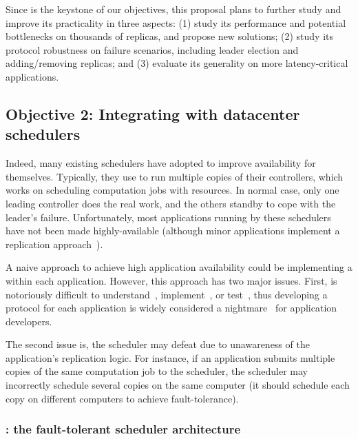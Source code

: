  Since \falcon is the keystone of our objectives, this 
proposal plans to further study and improve its practicality in three aspects: 
(1) study its performance and potential bottlenecks on thousands of replicas, 
and propose new solutions; (2) study its protocol robustness on failure 
scenarios, including leader election and adding/removing replicas; and (3) 
evaluate its generality on more latency-critical applications. 

\vspace{-.15in}\subsection{Objective 2: Integrating \falcon with datacenter 
schedulers}\label{sec:scheduler}\vspace{-.075in}

Indeed, many existing schedulers have adopted \paxos to improve availability 
for themselves. Typically, they use \paxos to run multiple copies of their 
controllers, which works on scheduling computation jobs with resources. In 
normal case, only one leading controller does the real work, and the others 
standby to cope with the leader's failure. Unfortunately, most applications 
running by these schedulers have not been made highly-available (although minor 
applications implement a replication 
approach~\cite{mapreduce,dolly:nsdi13}).

A naive approach to achieve high application availability could be implementing 
a \paxos within each application. However, this approach has two major issues. 
First, \paxos is notoriously difficult to 
understand~\cite{raft:usenix14,paxos:simple}, implement~\cite{paxos:practical, 
paxos:live}, or test~\cite{modist:nsdi09,demeter:sosp11}, thus developing a 
\paxos protocol for each application is widely considered a 
nightmare~\cite{modist:nsdi09,demeter:sosp11,paxos:live} for application 
developers.

The second issue is, the scheduler may defeat \paxos due to unawareness of the 
application's \paxos replication logic. For instance, if an application submits 
multiple copies of the same computation job to the scheduler, the scheduler may 
incorrectly schedule several copies on the same computer (it should schedule 
each copy on different computers to achieve \paxos fault-tolerance).

\vspace{-.15in}\subsubsection{\tripod: the fault-tolerant scheduler 
architecture} 
\label{sec:scheduler-arch}\vspace{-.075in}

